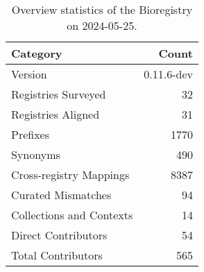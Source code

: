\begin{table}
\caption{Overview statistics of the Bioregistry on 2024-05-25.}
\label{tab:bioregistry-summary}
\begin{tabular}{lr}
\toprule
Category & Count \\
\midrule
Version & 0.11.6-dev \\
Registries Surveyed & 32 \\
Registries Aligned & 31 \\
Prefixes & 1770 \\
Synonyms & 490 \\
Cross-registry Mappings & 8387 \\
Curated Mismatches & 94 \\
Collections and Contexts & 14 \\
Direct Contributors & 54 \\
Total Contributors & 565 \\
\bottomrule
\end{tabular}
\end{table}
